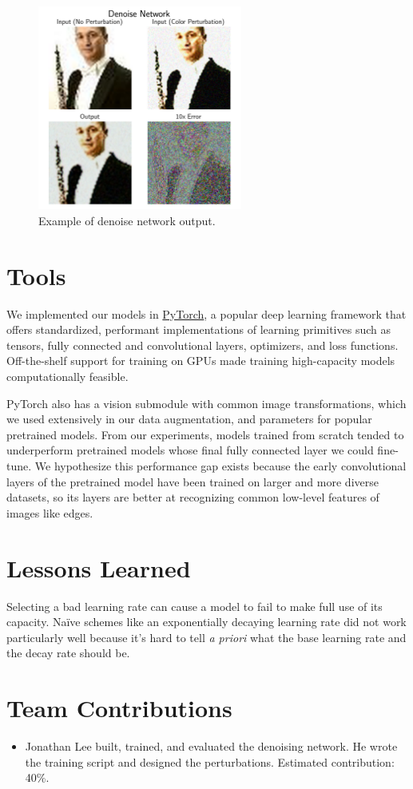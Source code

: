 \documentclass[justified]{article}
\begin{document}
  \begin{figure}[H]
    \centering
    \includegraphics[width=0.6\textwidth]{figures/denoise.png}
    \caption{
      Example of denoise network output.
    }
    \label{eq:denoise-example}
  \end{figure}

  \section{Tools}

  We implemented our models in \href{https://pytorch.org/}{PyTorch}, a popular deep learning framework that offers standardized, performant implementations of learning primitives such as tensors, fully connected and convolutional layers, optimizers, and loss functions.
  Off-the-shelf support for training on GPUs made training high-capacity models computationally feasible.

  PyTorch also has a vision submodule with common image transformations, which we used extensively in our data augmentation, and parameters for popular pretrained models.
  From our experiments, models trained from scratch tended to underperform pretrained models whose final fully connected layer we could fine-tune.
  We hypothesize this performance gap exists because the early convolutional layers of the pretrained model have been trained on larger and more diverse datasets, so its layers are better at recognizing common low-level features of images like edges.

  \section{Lessons Learned}

  Selecting a bad learning rate can cause a model to fail to make full use of its capacity.
  Na\"{i}ve schemes like an exponentially decaying learning rate did not work particularly well because it's hard to tell \textit{a priori} what the base learning rate and the decay rate should be.

  \section{Team Contributions}

  \begin{itemize}
  \item
    Jonathan Lee built, trained, and evaluated the denoising network.
    He wrote the training script and designed the perturbations.
    Estimated contribution: 40\%.
  \end{itemize}
\end{document}
